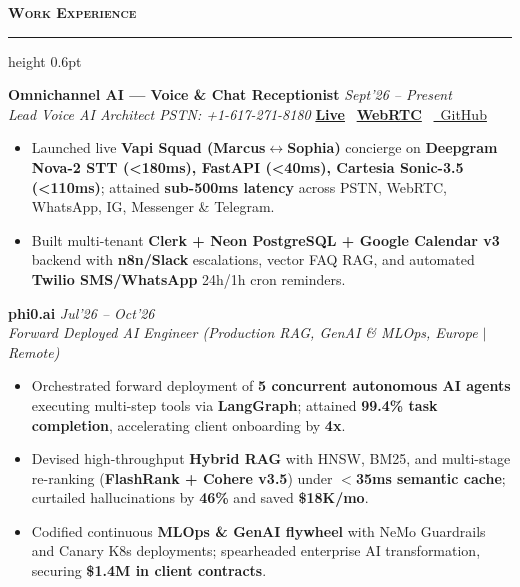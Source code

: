 \documentclass[10pt,a4paper]{article}
\newcommand{\resumesection}[1]{%
    \vspace{2.2pt}%
    {\color{burgundy}\scshape\bfseries\fontsize{9.0pt}{10.2pt}\selectfont #1}%
    \vspace{0.6pt}%
    \hrule height 0.6pt\relax%
    \vspace{1.6pt}%
}
\begin{document}
\noindent
\begin{minipage}[t]{0.488\textwidth}

    \resumesection{Work Experience}
    
    \noindent\textbf{Omnichannel AI --- Voice \& Chat Receptionist} \hfill {\footnotesize\textit{Sept'26 -- Present}}\\
    \textit{Lead Voice AI Architect \;\textbar\; PSTN: +1-617-271-8180} \; \href{https://ai-voice-receptionist.kishor.tech/}{\textbf{Live}} \textbar\ \href{https://ai-voice-receptionist.kishor.tech/vapi-call}{\textbf{WebRTC}} \textbar\ \href{https://github.com/KishorKumarParoi/omnichannel-voice-chat-ai-receptionist}{\faGithub\ GitHub}
    \begin{itemize}
        \item Launched live \textbf{Vapi Squad (Marcus$\leftrightarrow$Sophia)} concierge on \textbf{Deepgram Nova-2 STT (<180ms), FastAPI (<40ms), Cartesia Sonic-3.5 (<110ms)}; attained \textbf{sub-500ms latency} across PSTN, WebRTC, WhatsApp, IG, Messenger \& Telegram.
        \item Built multi-tenant \textbf{Clerk + Neon PostgreSQL + Google Calendar v3} backend with \textbf{n8n/Slack} escalations, vector FAQ RAG, and automated \textbf{Twilio SMS/WhatsApp} 24h/1h cron reminders.
    \end{itemize}

    \noindent\textbf{phi0.ai} \hfill {\footnotesize\textit{Jul'26 -- Oct'26}}\\
    \textit{Forward Deployed AI Engineer (Production RAG, GenAI \& MLOps, Europe $\vert$ Remote)}
    \begin{itemize}
        \item Orchestrated forward deployment of \textbf{5 concurrent autonomous AI agents} executing multi-step tools via \textbf{LangGraph}; attained \textbf{99.4\% task completion}, accelerating client onboarding by \textbf{4x}.
        \item Devised high-throughput \textbf{Hybrid RAG} with HNSW, BM25, and multi-stage re-ranking (\textbf{FlashRank + Cohere v3.5}) under \textbf{$<$35ms semantic cache}; curtailed hallucinations by \textbf{46\%} and saved \textbf{\$18K/mo}.
        \item Codified continuous \textbf{MLOps \& GenAI flywheel} with NeMo Guardrails and Canary K8s deployments; spearheaded enterprise AI transformation, securing \textbf{\$1.4M in client contracts}.
    \end{itemize}


\end{minipage}
\end{document}
